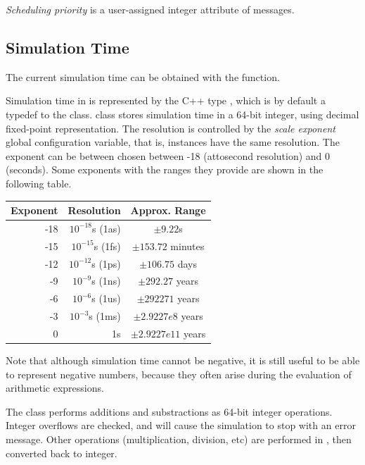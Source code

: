 \textit{Scheduling priority} is a user-assigned integer
attribute of messages.



\subsection{Simulation Time}
\label{sec:simple-modules:simulation-time}

The current simulation time can be obtained with the  function.

Simulation time in {\opp} is represented by the C++ type ,
which is by default a typedef to the  class.
 class stores simulation time in a 64-bit integer,
using decimal fixed-point representation. The resolution is controlled
by the \textit{scale exponent} global configuration variable, that is,
 instances have the same resolution. The exponent can be
between chosen between -18 (attosecond resolution) and 0 (seconds).
Some exponents with the ranges they provide are shown in the following table.

\begin{center}
  \begin{tabular}{ | r | r | c | }
    \hline
    Exponent & Resolution & Approx. Range \\ \hline
     -18 & $10^{-18}$s (1as) & $\pm 9.22$s \\
     -15 & $10^{-15}$s (1fs) & $\pm 153.72$ minutes \\
     -12 & $10^{-12}$s (1ps) & $\pm 106.75$ days \\
     -9  & $10^{-9}$s (1ns)  & $\pm 292.27$ years \\
     -6  & $10^{-6}$s (1us)  & $\pm 292271$ years \\
     -3  & $10^{-3}$s (1ms)  & $\pm 2.9227e8$ years \\
     0   & 1s                & $\pm 2.9227e11$ years \\
    \hline
  \end{tabular}
\end{center}

Note that although simulation time cannot be negative, it is still useful to
be able to represent negative numbers, because they often arise
during the evaluation of arithmetic expressions.

The  class performs additions and substractions as 64-bit integer
operations. Integer overflows are checked, and will cause the simulation to
stop with an error message. Other operations (multiplication, division, etc)
are performed in , then converted back to integer.

